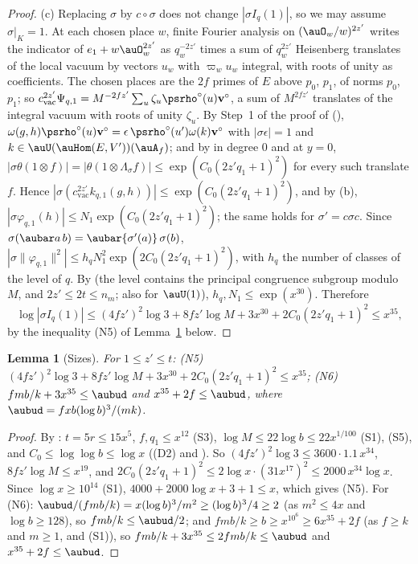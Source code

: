 \documentclass[10pt]{amsart}
\newtheorem{lemma}[theorem]{Lemma}
\theoremstyle{definition}
\theoremstyle{remark}
\providecommand{\psvac}{\mathbf v}
\begin{document}
\begin{proof}
(c) Replacing $\sigma$ by $c\circ\sigma$ does not change $|\sigma I_q(1)|$, so we may assume $\sigma|_K=
1$. At each chosen place $w$, finite Fourier analysis on $(\auO_w/w)^{2z'}$ writes the indicator of
$e_1+w\auO_w^{2z'}$ as $q_w^{-2z'}$ times a sum of $q_w^{2z'}$ Heisenberg translates of the local
vacuum by vectors $u_w$ with $\varpi_wu_w$ integral, with roots of unity as coefficients. The chosen
places are the $2f$ primes of $E$ above $p_0$, $p_1$, of norms $p_0$, $p_1$; so
$c_{\mathrm{vac}}^{2z'}\Psi_{q,1}=M^{-2fz'}\sum_u\zeta_u\psrho^\circ(u)\psvac^\circ$, a sum of
$M^{2fz'}$ translates of the integral vacuum with roots of unity $\zeta_u$. By Step~1 of the proof of
{\cite[Proposition~14.23]{P46}} ({\cite[\S5.1.5]{P49}}), $\omega(g,h)\psrho^\circ(u)\psvac^\circ=\epsilon
\,\psrho^\circ(u')\omega(k)\psvac^\circ$ with $|\sigma\epsilon|=1$ and $k\in\auU(\auHom(E,V'))
(\auA_f)$; and by {\cite[Lemma~5.7(i)]{P49}} in degree $0$ and {\cite[Lemma~5.7(ii)]{P49}} at $y=0$,
$|\sigma\theta(1\otimes f)|=|\theta(1\otimes\Lambda_\sigma f)|\le\exp(C_0(2z'q_1+1)^2)$ for every such
translate $f$. Hence $|\sigma(c_{\mathrm{vac}}^{2z'}k_{q,1}(g,h))|\le\exp(C_0(2z'q_1+1)^2)$, and by
(b), $|\sigma\varphi_{q,1}(h)|\le N_1\exp(C_0(2z'q_1+1)^2)$; the same holds for $\sigma'=c\sigma c$.
Since $\sigma(\aubar a\,b)=\aubar{\sigma'(a)}\,\sigma(b)$, $|\sigma\|\varphi_{q,1}\|^2|\le h_qN_1^2
\exp(2C_0(2z'q_1+1)^2)$, with $h_q$ the number of classes of the level of $q$. By
{\cite[Proposition~7.20]{P49}} (the level contains the principal congruence subgroup modulo $M$, and
$2z'\le2t\le n_m$; also for $\auU(1)$), $h_q,N_1\le\exp(x^{30})$. Therefore
\[
\log|\sigma I_q(1)|\le(4fz')^2\log3+8fz'\log M+3x^{30}+2C_0(2z'q_1+1)^2\le x^{35},
\]
by the inequality (N5) of Lemma~\ref{psu:sizes} below.
\end{proof}

\begin{lemma}[Sizes]\label{psu:sizes}
For $1\le z'\le t$:
\textup{(N5)} $(4fz')^2\log3+8fz'\log M+3x^{30}+2C_0(2z'q_1+1)^2\le x^{35}$;
\textup{(N6)} $fmb/k+3x^{35}\le\aubud$ and $x^{35}+2f\le\aubud$, where $\aubud=fxb(\log b)^3/(mk)$.
\end{lemma}
\begin{proof}
By {\cite[Lemma~13.4]{P46}}: $t=5r\le15x^5$, $f,q_1\le x^{12}$ (S3), $\log M\le22\log b\le22x^{1/100}$
(S1), (S5), and $C_0\le\log\log b\le\log x$ ((D2) and {\cite[(35)]{P46}}). So $(4fz')^2\log3\le
3600\cdot1.1\,x^{34}$, $8fz'\log M\le x^{19}$, and $2C_0(2z'q_1+1)^2\le2\log x\cdot(31x^{17})^2\le
2000\,x^{34}\log x$. Since $\log x\ge10^{14}$ (S1), $4000+2000\log x+3+1\le x$, which gives (N5).
For (N6): $\aubud/(fmb/k)=x(\log b)^3/m^2\ge(\log b)^3/4\ge2$ (as $m^2\le4x$ and $\log b\ge128$), so
$fmb/k\le\aubud/2$; and $fmb/k\ge b\ge x^{10^6}\ge6x^{35}+2f$ (as $f\ge k$ and $m\ge1$, and (S1)),
so $fmb/k+3x^{35}\le2fmb/k\le\aubud$ and $x^{35}+2f\le\aubud$.
\end{proof}
\end{document}
